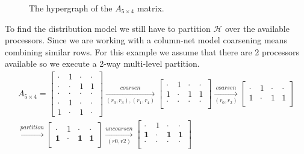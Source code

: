 \documentclass[../main.tex]{subfiles}
\begin{document}
\begin{solution}
\begin{enumerate}
\begin{figure}[H]
	\centering
	\caption{The hypergraph of the $A_{5\times4}$ matrix.}
	\label{fig:hypergraph}
	\end{figure}
	To find the distribution model we still have to partition $\mathcal{H}$ over the available processors. Since we are working with a column-net model coarsening means combining similar rows. For this example we assume that there are 2 processors available so we execute a 2-way multi-level partition.
	\begin{equation}
	\begin{multlined}
		A_{5\times4} =
		\begin{bmatrix}
		\cdot & 1 & \cdot & \cdot \\
		\cdot & \cdot & 1 & 1 \\
		\cdot & \cdot & \cdot & \cdot \\
		\cdot & 1 & \cdot & \cdot \\
		1 & \cdot & 1 & \cdot
		\end{bmatrix}
		\xrightarrow[(r_0,r_3),(r_1,r_4)]{coarsen}
		\begin{bmatrix}
		\cdot & 1 & \cdot & \cdot \\
		1 & \cdot & 1 & 1 \\
		\cdot & \cdot & \cdot & \cdot \\
		\end{bmatrix}
		\xrightarrow[(r_0,r_2)]{coarsen}
		\begin{bmatrix}
		\cdot & 1 & \cdot & \cdot \\
		1 & \cdot & 1 & 1 \\
		\end{bmatrix}
		\\
		\xrightarrow[]{partition}
		\begin{bmatrix}
		\cdot & 1 & \cdot & \cdot \\
		\mathbf{1} & \cdot & \mathbf{1} & \mathbf{1} \\
		\end{bmatrix}
		\xrightarrow[(r0,r2)]{uncoarsen}
		\begin{bmatrix}
		\cdot & 1 & \cdot & \cdot \\
		\mathbf{1} & \cdot & \mathbf{1} & \mathbf{1} \\
		\cdot & \cdot & \cdot & \cdot \\

\end{bmatrix}
\end{multlined}
\end{equation}
\end{enumerate}
\end{solution}
\end{document}
